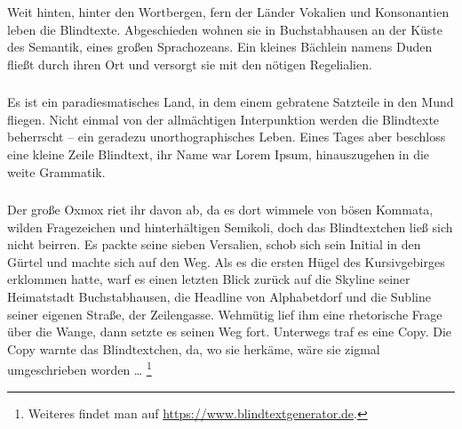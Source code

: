 \subsubsection{}
Weit hinten, hinter den Wortbergen, fern der Länder Vokalien und Konsonantien leben die Blindtexte. 
Abgeschieden wohnen sie in Buchstabhausen an der Küste des Semantik, eines großen Sprachozeans. 
Ein kleines Bächlein namens Duden fließt durch ihren Ort und versorgt sie mit den nötigen Regelialien. 
\subsubsection{}
Es ist ein paradiesmatisches Land, in dem einem gebratene Satzteile in den Mund fliegen. 
Nicht einmal von der allmächtigen Interpunktion werden die Blindtexte beherrscht -- ein geradezu unorthographisches Leben. 
Eines Tages aber beschloss eine kleine Zeile Blindtext, ihr Name war Lorem Ipsum, hinauszugehen in die weite Grammatik. 
\subsubsection{}
Der große Oxmox riet ihr davon ab, da es dort wimmele von bösen Kommata, wilden Fragezeichen und hinterhältigen Semikoli, doch das Blindtextchen ließ sich nicht beirren. 
Es packte seine sieben Versalien, schob sich sein Initial in den Gürtel und machte sich auf den Weg. 
Als es die ersten Hügel des Kursivgebirges erklommen hatte, warf es einen letzten Blick zurück auf die Skyline seiner Heimatstadt Buchstabhausen, die Headline von Alphabetdorf und die Subline seiner eigenen Straße, der Zeilengasse. 
Wehmütig lief ihm eine rhetorische Frage über die Wange, dann setzte es seinen Weg fort. 
Unterwegs traf es eine Copy. 
Die Copy warnte das Blindtextchen, da, wo sie herkäme, wäre sie zigmal umgeschrieben worden \ldots%
\footnote{Weiteres findet man auf \url{https://www.blindtextgenerator.de}.}
